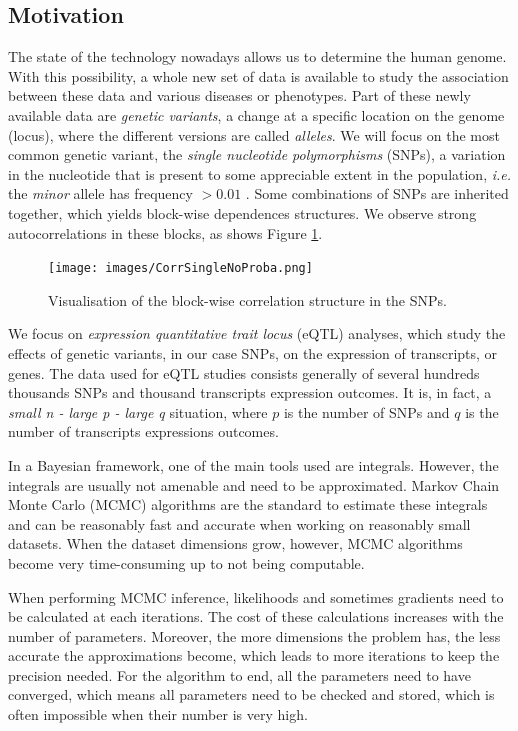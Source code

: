 \documentclass{article}
\numberwithin{equation}{section}
\begin{document}
\subsection{Motivation}
The state of the technology nowadays allows us to determine the human genome. With this possibility, a whole new set of data is available to study the association between these data and various diseases or phenotypes.  Part of these newly available data are \textit{genetic variants}, a change at a specific location on  the genome (locus), where the different versions are called \textit{alleles}. We will focus on the most common genetic variant, the \textit{single nucleotide polymorphisms} (SNPs), a variation in the nucleotide that is present to some appreciable extent in the population, \textit{i.e.} the \textit{minor} allele has frequency $> 0.01$ \cite{lewin}. Some combinations of SNPs are inherited together, which yields block-wise dependences structures. We observe strong autocorrelations in these blocks, as shows Figure \ref{fig:corr}.
\begin{figure}
\centering
\texttt{[image: images/CorrSingleNoProba.png]}
\caption{\label{fig:corr} Visualisation of the block-wise correlation structure in the SNPs.}
\end{figure}

We focus on \textit{expression quantitative trait locus} (eQTL) analyses, which study the effects of genetic variants, in our case SNPs, on the expression of transcripts, or genes. The data used for eQTL studies consists generally of several hundreds thousands SNPs and thousand transcripts expression outcomes. It is, in fact, a \textit{small n - large p - large q} situation, where $p$ is the number of SNPs and $q$ is the number of transcripts expressions outcomes.

In a Bayesian framework, one of the main tools used are integrals. However, the integrals are usually not amenable and need to be approximated. Markov Chain Monte Carlo (MCMC) algorithms are the standard to estimate these integrals and can be reasonably fast and accurate when working on reasonably small datasets. When the dataset dimensions grow, however, MCMC algorithms become very time-consuming up to not being computable.

When performing MCMC inference, likelihoods and sometimes gradients need to be calculated at each iterations. The cost of these calculations increases with the number of parameters. Moreover, the more dimensions the problem has, the less accurate the approximations become, which leads to more iterations to keep the precision needed. For the algorithm to end, all the parameters need to have converged, which means all parameters need to be checked and stored, which is often impossible when their number is very high.
\end{document}

